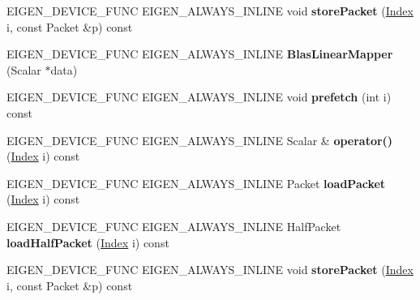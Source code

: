\begin{DoxyCompactItemize}
E\+I\+G\+E\+N\+\_\+\+D\+E\+V\+I\+C\+E\+\_\+\+F\+U\+NC E\+I\+G\+E\+N\+\_\+\+A\+L\+W\+A\+Y\+S\+\_\+\+I\+N\+L\+I\+NE void {\bfseries store\+Packet} (\hyperlink{namespace_eigen_a62e77e0933482dafde8fe197d9a2cfde}{Index} i, const Packet \&p) const
\item 
\mbox{\label{class_eigen_1_1internal_1_1_blas_linear_mapper_a7f663c011737427cae88044cc69b4918}} 
E\+I\+G\+E\+N\+\_\+\+D\+E\+V\+I\+C\+E\+\_\+\+F\+U\+NC E\+I\+G\+E\+N\+\_\+\+A\+L\+W\+A\+Y\+S\+\_\+\+I\+N\+L\+I\+NE {\bfseries Blas\+Linear\+Mapper} (Scalar $\ast$data)
\item 
\mbox{\label{class_eigen_1_1internal_1_1_blas_linear_mapper_ad17cc10aa0e1557737199bed14a1b784}} 
E\+I\+G\+E\+N\+\_\+\+D\+E\+V\+I\+C\+E\+\_\+\+F\+U\+NC E\+I\+G\+E\+N\+\_\+\+A\+L\+W\+A\+Y\+S\+\_\+\+I\+N\+L\+I\+NE void {\bfseries prefetch} (int i) const
\item 
\mbox{\label{class_eigen_1_1internal_1_1_blas_linear_mapper_a0b6a635dc05553ee31bde3a7c4527706}} 
E\+I\+G\+E\+N\+\_\+\+D\+E\+V\+I\+C\+E\+\_\+\+F\+U\+NC E\+I\+G\+E\+N\+\_\+\+A\+L\+W\+A\+Y\+S\+\_\+\+I\+N\+L\+I\+NE Scalar \& {\bfseries operator()} (\hyperlink{namespace_eigen_a62e77e0933482dafde8fe197d9a2cfde}{Index} i) const
\item 
\mbox{\label{class_eigen_1_1internal_1_1_blas_linear_mapper_a42eaa16ed738ea667a2d5f69fc6f5985}} 
E\+I\+G\+E\+N\+\_\+\+D\+E\+V\+I\+C\+E\+\_\+\+F\+U\+NC E\+I\+G\+E\+N\+\_\+\+A\+L\+W\+A\+Y\+S\+\_\+\+I\+N\+L\+I\+NE Packet {\bfseries load\+Packet} (\hyperlink{namespace_eigen_a62e77e0933482dafde8fe197d9a2cfde}{Index} i) const
\item 
\mbox{\label{class_eigen_1_1internal_1_1_blas_linear_mapper_ad0b309a443fe66f1a6c96ecc7e7d209e}} 
E\+I\+G\+E\+N\+\_\+\+D\+E\+V\+I\+C\+E\+\_\+\+F\+U\+NC E\+I\+G\+E\+N\+\_\+\+A\+L\+W\+A\+Y\+S\+\_\+\+I\+N\+L\+I\+NE Half\+Packet {\bfseries load\+Half\+Packet} (\hyperlink{namespace_eigen_a62e77e0933482dafde8fe197d9a2cfde}{Index} i) const
\item 
\mbox{\label{class_eigen_1_1internal_1_1_blas_linear_mapper_abe3c1c4047295e21b64e4f8bb13ddea5}} 
E\+I\+G\+E\+N\+\_\+\+D\+E\+V\+I\+C\+E\+\_\+\+F\+U\+NC E\+I\+G\+E\+N\+\_\+\+A\+L\+W\+A\+Y\+S\+\_\+\+I\+N\+L\+I\+NE void {\bfseries store\+Packet} (\hyperlink{namespace_eigen_a62e77e0933482dafde8fe197d9a2cfde}{Index} i, const Packet \&p) const
\end{DoxyCompactItemize}
